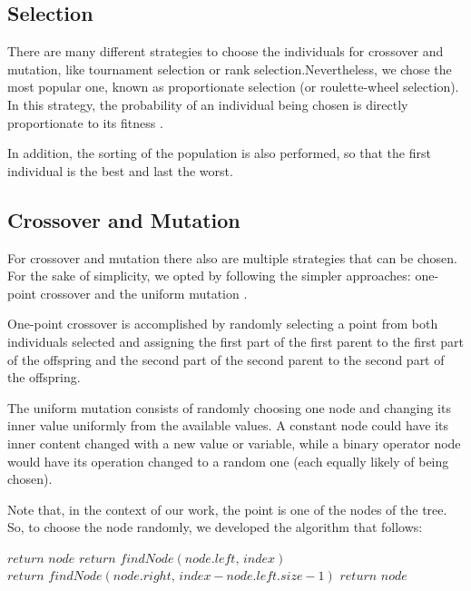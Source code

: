 \documentclass[runningheads]{llncs}
\begin{document}
\subsection{Selection}

There are many different strategies to choose the individuals for crossover and mutation, like tournament selection or rank selection.Nevertheless, we chose the most popular one, known as proportionate selection (or roulette-wheel selection). In this strategy, the probability of an individual being chosen is directly proportionate to its fitness \cite{martins2016gacuda}.

In addition, the sorting of the population is also performed, so that the first individual is the best and last the worst.

\subsection{Crossover and Mutation}

For crossover and mutation there also are multiple strategies that can be chosen. For the sake of simplicity, we opted by following the simpler approaches: one-point crossover and the uniform mutation \cite{martins2016gacuda}.

One-point crossover is accomplished by randomly selecting a point from both individuals selected and assigning the first part of the first parent to the first part of the offspring and the second part of the second parent to the second part of the offspring.

The uniform mutation consists of randomly choosing one node and changing its inner value uniformly from the available values. A constant node could have its inner content changed with a new value or variable, while a binary operator node would have its operation changed to a random one (each equally likely of being chosen).

Note that, in the context of our work, the point is one of the nodes of the tree. So, to choose the node randomly, we developed the algorithm that follows:
\begin{algorithmic}
        \State $return \,\, node$
\Else 
           \State $return \,\, findNode(node.left,\,index)$
           \State $return \,\, findNode(node.right,\,index - node.left.size - 1)$
       \Else
	 \State $return \,\, node$
       \EndIf
\EndIf
\end{algorithmic}
\end{document}
